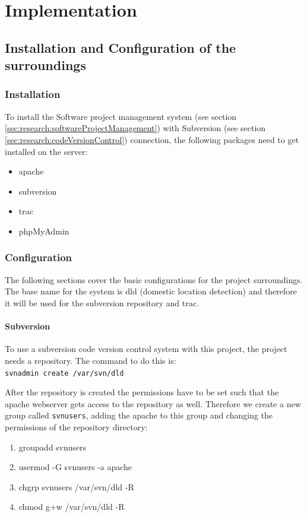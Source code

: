 \chapter{Implementation}
 \section{Installation and Configuration of the surroundings}
  \subsection{Installation}
  \label{sec:implementation:installation}
   To install the Software project management system (see section \ref{sec:research:softwareProjectManagement}) with Subversion (see section \ref{sec:research:codeVersionControl}) connection, the following packages need to get installed on the server:
   \begin{itemize}
    \item apache
    \item subversion
    \item trac
    \item phpMyAdmin
   \end{itemize}

  \subsection{Configuration}
   The following sections cover the basic configurations for the project surroundings. The base name for the system is dld (domestic location detection) and therefore it will be used for the subversion repository and trac.

   \subsubsection{Subversion}
    To use a subversion code version control system with this project, the project needs a repository. The command to do this is:\\
    \verb=svnadmin create /var/svn/dld=
    
    After the repository is created the permissions have to be set such that the apache webserver gets access to the repository as well. Therefore we create a new group called \verb=svnusers=, adding the apache to this group and changing the permissions of the repository directory:
    \begin{enumerate}
     \item groupadd svnusers
     \item usermod -G svnusers -a apache
     \item chgrp svnusers /var/svn/dld -R
     \item chmod g+w /var/svn/dld -R
    \end{enumerate}

